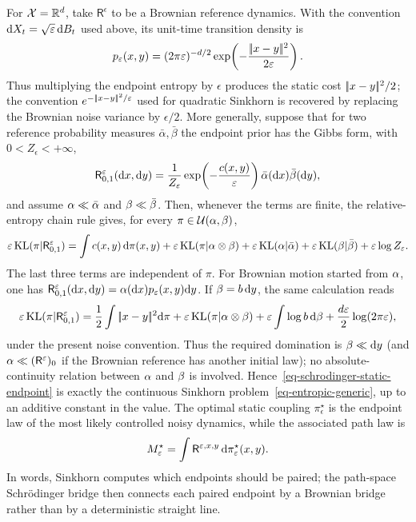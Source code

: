 For $\mathcal{X}=\mathbb{R}^d$, take $\mathsf R^\epsilon$ to be a Brownian reference dynamics. With the convention $\mathrm{d} X_t=\sqrt{\varepsilon}\,\mathrm{d} B_t$ used above, its unit-time transition density is
\[
	p_\varepsilon(x,y)
	=
	(2\pi\varepsilon)^{-d/2}
	\exp\!\left(-\frac{|\!| x-y |\!|^2}{2\varepsilon}\right).
\]
Thus multiplying the endpoint entropy by $\epsilon$ produces the static cost $|\!| x-y |\!|^2/2$; the convention $e^{-|\!| x-y |\!|^2/\varepsilon}$ used for quadratic Sinkhorn is recovered by replacing the Brownian noise variance by $\epsilon/2$. More generally, suppose that for two reference probability measures $\bar\alpha,\bar\beta$ the endpoint prior has the Gibbs form, with $0<Z_\epsilon<+\infty$,
\[
	\mathsf R^\varepsilon_{0,1}(\mathrm{d} x,\mathrm{d} y)
	=
	\frac1{Z_\varepsilon}
	\exp\!\left(-\frac{c(x,y)}{\varepsilon}\right)
	\bar\alpha(\mathrm{d} x)\bar\beta(\mathrm{d} y),
\]
and assume $\alpha\ll\bar\alpha$ and $\beta\ll\bar\beta$. Then, whenever the terms are finite, the relative-entropy chain rule gives, for every $\pi\in\mathcal{U}(\alpha,\beta)$,
\[
	\varepsilon\operatorname{KL}(\pi|\mathsf R^\varepsilon_{0,1})
	=
	\int c(x,y)\,\mathrm{d}\pi(x,y)
	+
	\varepsilon\operatorname{KL}(\pi|\alpha\otimes\beta)
	+
	\varepsilon\operatorname{KL}(\alpha|\bar\alpha)
	+
	\varepsilon\operatorname{KL}(\beta|\bar\beta)
	+
	\varepsilon\log Z_\varepsilon.
\]
The last three terms are independent of $\pi$. For Brownian motion started from $\alpha$, one has $\mathsf R^\varepsilon_{0,1}(\mathrm{d} x,\mathrm{d} y)=\alpha(\mathrm{d} x)p_\varepsilon(x,y)\mathrm{d} y$. If $\beta=b\,\mathrm{d} y$, the same calculation reads
\[
	\varepsilon\operatorname{KL}(\pi|\mathsf R^\varepsilon_{0,1})
	=
	\frac12\int|\!| x-y |\!|^2\mathrm{d}\pi
	+
	\varepsilon\operatorname{KL}(\pi|\alpha\otimes\beta)
	+
	\varepsilon\int\log b\,\mathrm{d}\beta
	+
	\frac{d\varepsilon}{2}\log(2\pi\varepsilon),
\]
under the present noise convention. Thus the required domination is $\beta\ll\mathrm{d} y$ (and $\alpha\ll(\mathsf R^\varepsilon)_0$ if the Brownian reference has another initial law); no absolute-continuity relation between $\alpha$ and $\beta$ is involved. Hence~\eqref{eq-schrodinger-static-endpoint} is exactly the continuous Sinkhorn problem~\eqref{eq-entropic-generic}, up to an additive constant in the value. The optimal static coupling $\pi_\epsilon^\star$ is the endpoint law of the most likely controlled noisy dynamics, while the associated path law is
\[
	M_\varepsilon^\star
	=
	\int \mathsf R^{\varepsilon,x,y}\,\mathrm{d}\pi_\varepsilon^\star(x,y).
\]
In words, Sinkhorn computes which endpoints should be paired; the path-space Schr\"odinger bridge then connects each paired endpoint by a Brownian bridge rather than by a deterministic straight line.

